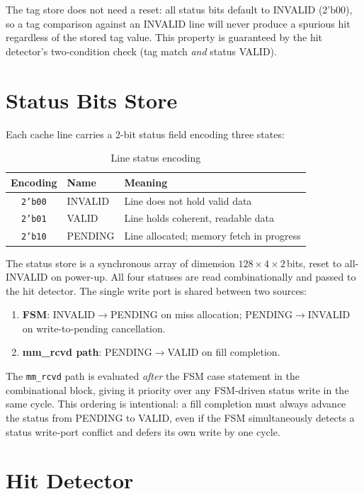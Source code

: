 \documentclass[12pt,letterpaper]{report}
\begin{document}
The tag store does not need a reset: all status bits default to
INVALID (2'b00), so a tag comparison against an INVALID line will
never produce a spurious hit regardless of the stored tag value.
This property is guaranteed by the hit detector's two-condition check
(tag match \emph{and} status VALID).

\section{Status Bits Store}

Each cache line carries a 2-bit status field encoding three states:

\begin{table}[h]
\centering
\caption{Line status encoding}
\label{tab:status}
\begin{tabular}{@{}cll@{}}
\toprule
Encoding & Name & Meaning \\
\midrule
\texttt{2'b00} & INVALID & Line does not hold valid data \\
\texttt{2'b01} & VALID   & Line holds coherent, readable data \\
\texttt{2'b10} & PENDING & Line allocated; memory fetch in progress \\
\bottomrule
\end{tabular}
\end{table}

The status store is a synchronous array of dimension $128 \times 4
\times 2$\,bits, reset to all-INVALID on power-up.  All four statuses
are read combinationally and passed to the hit detector.  The single
write port is shared between two sources:

\begin{enumerate}[label=\arabic*.]
  \item \textbf{FSM}: INVALID$\to$PENDING on miss allocation;
        PENDING$\to$INVALID on write-to-pending cancellation.
  \item \textbf{mm\_rcvd path}: PENDING$\to$VALID on fill completion.
\end{enumerate}

The \texttt{mm\_rcvd} path is evaluated \emph{after} the FSM case
statement in the combinational block, giving it priority over any
FSM-driven status write in the same cycle.  This ordering is
intentional: a fill completion must always advance the status from
PENDING to VALID, even if the FSM simultaneously detects a status
write-port conflict and defers its own write by one cycle.

\section{Hit Detector}
\end{document}
